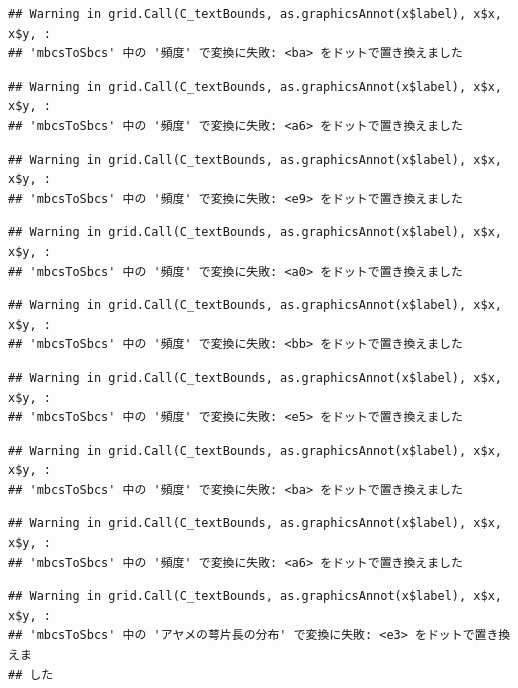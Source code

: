 \documentclass[
]{book}
\begin{document}
\begin{verbatim}
## Warning in grid.Call(C_textBounds, as.graphicsAnnot(x$label), x$x, x$y, :
## 'mbcsToSbcs' 中の '頻度' で変換に失敗: <ba> をドットで置き換えました
\end{verbatim}

\begin{verbatim}
## Warning in grid.Call(C_textBounds, as.graphicsAnnot(x$label), x$x, x$y, :
## 'mbcsToSbcs' 中の '頻度' で変換に失敗: <a6> をドットで置き換えました
\end{verbatim}

\begin{verbatim}
## Warning in grid.Call(C_textBounds, as.graphicsAnnot(x$label), x$x, x$y, :
## 'mbcsToSbcs' 中の '頻度' で変換に失敗: <e9> をドットで置き換えました
\end{verbatim}

\begin{verbatim}
## Warning in grid.Call(C_textBounds, as.graphicsAnnot(x$label), x$x, x$y, :
## 'mbcsToSbcs' 中の '頻度' で変換に失敗: <a0> をドットで置き換えました
\end{verbatim}

\begin{verbatim}
## Warning in grid.Call(C_textBounds, as.graphicsAnnot(x$label), x$x, x$y, :
## 'mbcsToSbcs' 中の '頻度' で変換に失敗: <bb> をドットで置き換えました
\end{verbatim}

\begin{verbatim}
## Warning in grid.Call(C_textBounds, as.graphicsAnnot(x$label), x$x, x$y, :
## 'mbcsToSbcs' 中の '頻度' で変換に失敗: <e5> をドットで置き換えました
\end{verbatim}

\begin{verbatim}
## Warning in grid.Call(C_textBounds, as.graphicsAnnot(x$label), x$x, x$y, :
## 'mbcsToSbcs' 中の '頻度' で変換に失敗: <ba> をドットで置き換えました
\end{verbatim}

\begin{verbatim}
## Warning in grid.Call(C_textBounds, as.graphicsAnnot(x$label), x$x, x$y, :
## 'mbcsToSbcs' 中の '頻度' で変換に失敗: <a6> をドットで置き換えました
\end{verbatim}

\begin{verbatim}
## Warning in grid.Call(C_textBounds, as.graphicsAnnot(x$label), x$x, x$y, :
## 'mbcsToSbcs' 中の 'アヤメの萼片長の分布' で変換に失敗: <e3> をドットで置き換えま
## した
\end{verbatim}
\end{document}

